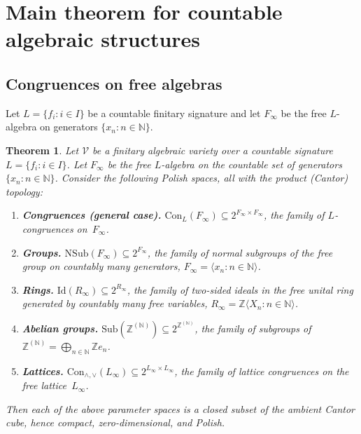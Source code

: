 \documentclass[12pt,fleqn,a4paper]{amsart}
\numberwithin{equation}{section}
\newtheorem{theorem}{Theorem}[section]
\theoremstyle{definition}
\newcommand{\N}{\mathbb{N}}
\newcommand{\Z}{\mathbb{Z}}
\newcommand{\Con}{\mathrm{Con}}
\newcommand{\NSub}{\mathrm{NSub}}
\newcommand{\Id}{\mathrm{Id}}
\newcommand{\Sub}{\mathrm{Sub}}
\begin{document}
\section{Main theorem for countable algebraic structures}\label{sec:countable}

\subsection{Congruences on free algebras}

Let $L=\{f_i:i\in I\}$ be a countable finitary signature and let $F_\infty$ be the
free $L$-algebra on generators $\{x_n:n\in\N\}$.

\begin{theorem}
\label{thm:free-objects-closed}
Let $\mathcal V$ be a finitary algebraic variety over a countable signature
$L=\{f_i:i\in I\}$.  Let $F_\infty$ be the free $L$-algebra on the countable set of
generators $\{x_n:n\in\N\}$.  Consider the following Polish spaces, all with the
product (Cantor) topology:

\begin{enumerate}
\item \textbf{Congruences (general case).}
$\Con_L(F_\infty)\subseteq 2^{F_\infty\times F_\infty}$, the family of
$L$-congruences on~$F_\infty$.

\item \textbf{Groups.}
$\NSub(F_\infty)\subseteq 2^{F_\infty}$, the family of normal subgroups of the
free group on countably many generators, $F_\infty=\langle x_n:n\in\N\rangle$.

\item \textbf{Rings.}
$\Id(R_\infty)\subseteq 2^{R_\infty}$, the family of two-sided ideals in the
free unital ring generated by countably many free variables, $R_\infty=\Z\langle X_n:n\in\N\rangle$.

\item \textbf{Abelian groups.}
$\Sub(\Z^{(\N)})\subseteq 2^{\Z^{(\N)}}$, the family of subgroups of
$\Z^{(\N)}=\bigoplus_{n\in\N}\Z e_n$.

\item \textbf{Lattices.}
$\Con_{\wedge,\vee}(L_\infty)\subseteq 2^{L_\infty\times L_\infty}$, the family of
lattice congruences on the free lattice~$L_\infty$.
\end{enumerate}

Then each of the above parameter spaces is a \emph{closed} subset of the ambient
Cantor cube, hence compact, zero-dimensional, and Polish.
\end{theorem}
\end{document}
